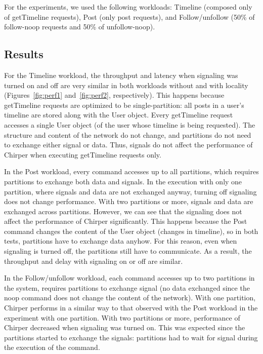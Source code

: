 \documentclass[11pt]{article}
\newcommand{\appname}{Chirper} %
\begin{document}
For the experiments, we used the following workloads:
Timeline (composed only of getTimeline requests),
Post (only post requests), and
Follow/unfollow (50\% of follow-noop requests and 50\% of unfollow-noop).


\subsection{Results}
\label{sec:evaluation:result}

For the Timeline workload, the throughput and latency when signaling was turned on and off are very similar in both workloads without and with locality (Figures~\ref{fig:perf1} and~\ref{fig:perf2}, respectively).
This happens because getTimeline requests are optimized to be single-partition:
all posts in a user's timeline are stored along with the User object.
Every getTimeline request accesses a single User object (of the user whose timeline is being requested).
The structure and content of the network do not change, and partitions do not need to exchange either signal or data.
Thus, signals do not affect the performance of \appname{} when executing getTimeline requests only.

In the Post workload, every command accesses up to all partitions, which requires partitions to exchange both data and signals.
In the execution with only one partition, where signals and data are not exchanged anyway, turning off signaling does not change performance.
With two partitions or more, signals and data are exchanged across partitions. 
However, we can see that the signaling does not affect the performance of \appname{} significantly. This happens because the Post command changes the content of the User object (changes in timeline), so in both tests, partitions have to exchange data anyhow. For this reason, even when signaling is turned off, the partitions still have to communicate. 
As a result, the throughput and delay with signaling on or off are similar.

In the Follow/unfollow workload, each command accesses up to two partitions in the system, requires partitions to exchange signal (no data exchanged since the noop command does not change the content of the network).
With one partition, \appname{} performs in a similar way to that observed with the Post workload in the experiment with one partition.
With two partitions or more, performance of \appname{} decreased when signaling was turned on. 
This was expected since the partitions started to exchange the signals: partitions had to wait for signal during the execution of the command.
\end{document}
